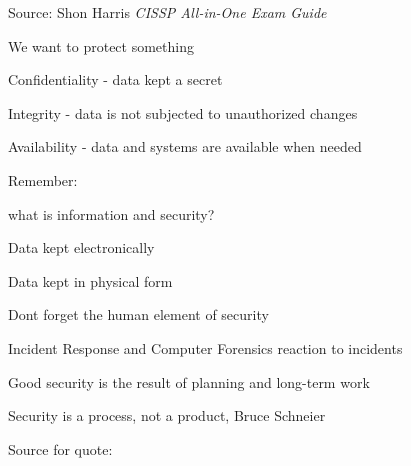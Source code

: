 \documentclass[Screen16to9,17pt]{foils}
\begin{document}


Source: Shon Harris \emph{CISSP All-in-One Exam Guide}



\begin{list1}
\item We want to protect something
\item Confidentiality - data kept a secret
\item Integrity - data is not subjected to unauthorized changes
\item Availability - data and systems are available when needed
\end{list1}


\begin{list1}
\item Remember:
\begin{list2}
\item what is information and security?
\item Data kept electronically
\item Data kept in physical form
\item Dont forget the human element of security
\end{list2}
\item Incident Response and Computer Forensics reaction to incidents
\item Good security is the result of planning and long-term work
\end{list1}
\vskip 1cm
\centerline{\color{titlecolor}\LARGE Security is a process, not a product, Bruce Schneier}

Source for quote: 


\end{document}
